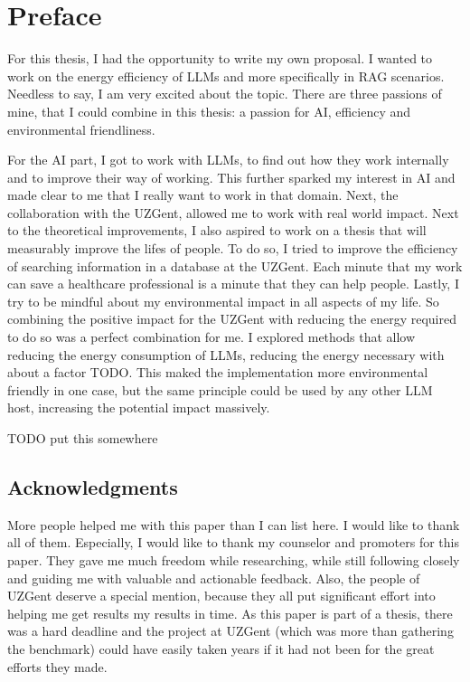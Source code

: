 
\titleformat{\chapter}{}{}{0em}{\bf\Huge}
\chapter*{Preface}

For this thesis, I had the opportunity to write my own proposal. I wanted to work on the energy efficiency of LLMs and more specifically in RAG scenarios. Needless to say, I am very excited about the topic. There are three passions of mine, that I could combine in this thesis: a passion for AI, efficiency and environmental friendliness. 

For the AI part, I got to work with LLMs, to find out how they work internally and to improve their way of working. This further sparked my interest in AI and made clear to me that I really want to work in that domain. Next, the collaboration with the UZGent, allowed me to work with real world impact. Next to the theoretical improvements, I also aspired to work on a thesis that will measurably improve the lifes of people. To do so, I tried to improve the efficiency of searching information in a database at the UZGent. Each minute that my work can save a healthcare professional is a minute that they can help people. Lastly, I try to be mindful about my environmental impact in all aspects of my life. So combining the positive impact for the UZGent with reducing the energy required to do so was a perfect combination for me. I explored methods that allow reducing the energy consumption of LLMs, reducing the energy necessary with about a factor TODO. This maked the implementation more environmental friendly in one case, but the same principle could be used by any other LLM host, increasing the potential impact massively.

TODO put this somewhere

\section*{Acknowledgments}
More people helped me with this paper than I can list here. I would like to thank all of them. Especially, I would like to thank my counselor and promoters for this paper. They gave me much freedom while researching, while still following closely and guiding me with valuable and actionable feedback. Also, the people of UZGent deserve a special mention, because they all put significant effort into helping me get results my results in time. As this paper is part of a thesis, there was a hard deadline and the project at UZGent (which was more than gathering the benchmark) could have easily taken years if it had not been for the great efforts they made.